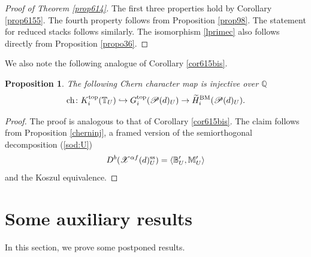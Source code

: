 \documentclass [11pt,oneside,a4paper,mathscr]{amsart}
\newtheorem{prop}[thm]{Proposition}
\theoremstyle{definition}
\newcommand{\X}{\mathscr{X}}
\begin{document}
\begin{proof}[Proof of Theorem \ref{prop614}]
    The first three properties hold by Corollary \ref{prop6155}. The fourth property follows from Proposition \ref{prop98}.
    The statement for reduced stacks follows similarly. The isomorphism \eqref{lprimec} also follows directly from Proposition \ref{propo36}.
\end{proof}


We also note the following analogue of Corollary \ref{cor615bis}.

\begin{prop}
    The following Chern character map 
    is injective over $\mathbb{Q}$ \[\mathrm{ch}\colon K^{\mathrm{top}}_i(\mathbb{T}_U)\hookrightarrow G^{\mathrm{top}}_i(\mathscr{P}(d)_U)\to 
    \widetilde{H}_i^{\rm{BM}}(\mathscr{P}(d)_U).\] 
\end{prop}

\begin{proof}
The proof is analogous to that of Corollary \ref{cor615bis}.
    The claim follows from Proposition \ref{cherninj}, a framed version of 
    the semiorthogonal decomposition (\ref{sod:U})
    \begin{align*}
        D^b(\X^{\alpha f}(d)^{\rm{ss}}_U)=\langle \mathbb{B}_U', \mathbb{M}_U'\rangle
    \end{align*}
    and the Koszul equivalence. 
\end{proof}















\section{Some auxiliary results}\label{sec:aux}
In this section, we prove some postponed results. 
\end{document}
